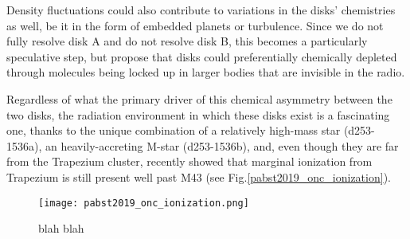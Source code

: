 
Density fluctuations could also contribute to variations in the disks' chemistries as well, be it in the form of embedded planets or turbulence. Since we do not fully resolve disk A and do not resolve disk B, this becomes a particularly speculative step, but \citet{Miotello2016} propose that disks could preferentially chemically depleted through molecules being locked up in larger bodies that are invisible in the radio.




Regardless of what the primary driver of this chemical asymmetry between the two disks, the radiation environment in which these disks exist is a fascinating one, thanks to the unique combination of a relatively high-mass star (d253-1536a), an heavily-accreting M-star (d253-1536b), and, even though they are far from the Trapezium cluster, \citet{Pabst2019} recently showed that marginal ionization from Trapezium is still present well past M43 (see Fig.\ref{pabst2019_onc_ionization}).




\begin{figure}[h]
  \texttt{[image: pabst2019\_onc\_ionization.png]}%
  \caption{blah blah}
  \label{fig:pabst2019_onc_ionization}
\end{figure}








